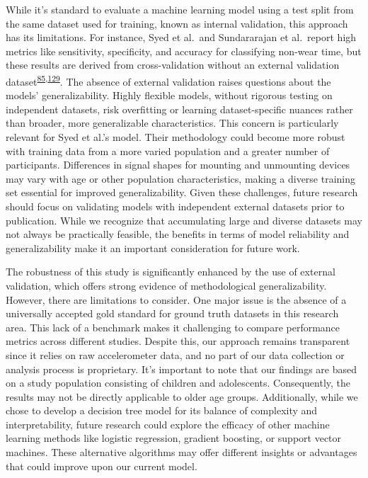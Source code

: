 \documentclass[
  10pt,
]{scrbook}
\begin{document}
While it's standard to evaluate a machine learning model using a test
split from the same dataset used for training, known as internal
validation, this approach has its limitations. For instance, Syed et
al.~and Sundararajan et al.~report high metrics like sensitivity,
specificity, and accuracy for classifying non-wear time, but these
results are derived from cross-validation without an external validation
dataset\textsuperscript{\protect\hyperlink{ref-sundararajan_sleep_2021}{85},\protect\hyperlink{ref-syed_evaluating_2020}{129}}.
The absence of external validation raises questions about the models'
generalizability. Highly flexible models, without rigorous testing on
independent datasets, risk overfitting or learning dataset-specific
nuances rather than broader, more generalizable characteristics. This
concern is particularly relevant for Syed et al.'s model. Their
methodology could become more robust with training data from a more
varied population and a greater number of participants. Differences in
signal shapes for mounting and unmounting devices may vary with age or
other population characteristics, making a diverse training set
essential for improved generalizability. Given these challenges, future
research should focus on validating models with independent external
datasets prior to publication. While we recognize that accumulating
large and diverse datasets may not always be practically feasible, the
benefits in terms of model reliability and generalizability make it an
important consideration for future work.

The robustness of this study is significantly enhanced by the use of
external validation, which offers strong evidence of methodological
generalizability. However, there are limitations to consider. One major
issue is the absence of a universally accepted gold standard for ground
truth datasets in this research area. This lack of a benchmark makes it
challenging to compare performance metrics across different studies.
Despite this, our approach remains transparent since it relies on raw
accelerometer data, and no part of our data collection or analysis
process is proprietary. It's important to note that our findings are
based on a study population consisting of children and adolescents.
Consequently, the results may not be directly applicable to older age
groups. Additionally, while we chose to develop a decision tree model
for its balance of complexity and interpretability, future research
could explore the efficacy of other machine learning methods like
logistic regression, gradient boosting, or support vector machines.
These alternative algorithms may offer different insights or advantages
that could improve upon our current model.
\end{document}
